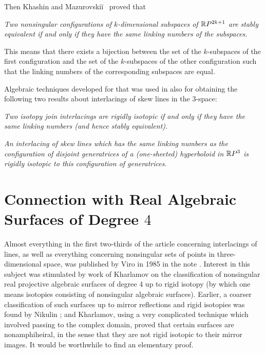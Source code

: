 \documentclass{article}
\begin{document}
Then Khashin and Mazurovski\u{i}\  \cite{KM} proved that 

{\em Two nonsingular
configurations of $k$-dimensional subspaces of $\mathbb{R} P^{2k+1}$ are stably
equivalent if and only if they have the same linking numbers of the
subspaces.} 

This means that there exists a bijection between the set of
the $k$-subspaces of the first configuration and the set of the
$k$-subspaces of the other configuration such that the linking numbers
of the corresponding subspaces are equal. 

Algebraic techniques developed for that was used in \cite{KM} also for
obtaining the following two results about interlacings of skew lines in
the 3-space: 

{\em  Two isotopy join interlacings are rigidly isotopic if and only
if they have the same linking numbers (and hence stably equivalent).}

{\em An interlacing of skew lines which has the same linking numbers as
the configuration of disjoint generatrices of a (one-sheeted) hyperboloid in 
$\mathbb{R} P^3$  is rigidly isotopic to this configuration of generatrices.}





\section{Connection with Real Algebraic Surfaces of Degree 
$4$} 

Almost everything in the first two-thirds of the article concerning 
interlacings of
lines, as well as everything concerning nonsingular sets of points in
three-dimensional space, was published by Viro in 1985 in the note 
\cite{3}.
Interest in this subject was stimulated by work of Kharlamov on the
classification of nonsingular real projective algebraic surfaces of degree 4 up
to rigid isotopy (by which one means isotopies consisting of nonsingular
algebraic surfaces). Earlier, a coarser classification of such surfaces up to
mirror reflections and rigid isotopies was found by Nikulin 
\cite{12}; and
Kharlamov, using a very complicated technique which involved passing to the
complex domain, proved that certain surfaces are nonamphiheiral, in the sense that
they are not rigid isotopic to their mirror images. It would be worthwhile to
find an elementary proof.
\end{document}
